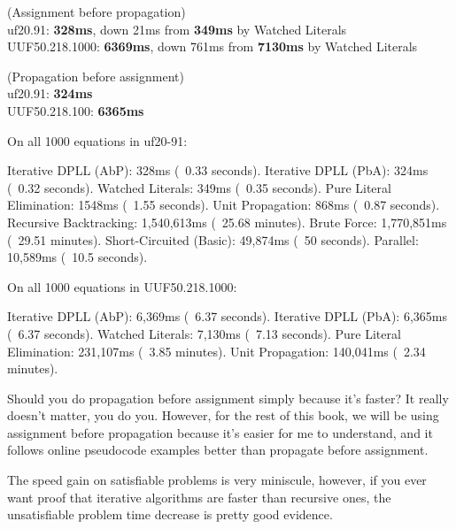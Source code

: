 \documentclass[../main.tex]{subfiles}
\begin{document}
(Assignment before propagation)\\
uf20.91: \textbf{328ms}, down 21ms from \textbf{349ms} by Watched Literals\\
UUF50.218.1000: \textbf{6369ms}, down 761ms from \textbf{7130ms} by Watched Literals

(Propagation before assignment)\\
uf20.91: \textbf{324ms}\\
UUF50.218.100: \textbf{6365ms}

\begin{FVerbatim}
On all 1000 equations in uf20-91:

Iterative DPLL (AbP):      328ms (~0.33 seconds).
Iterative DPLL (PbA):      324ms (~0.32 seconds).
Watched Literals:          349ms (~0.35 seconds).
Pure Literal Elimination:  1548ms (~1.55 seconds).
Unit Propagation:          868ms (~0.87 seconds).
Recursive Backtracking:    1,540,613ms (~25.68 minutes).
Brute Force:               1,770,851ms (~29.51 minutes).
Short-Circuited (Basic):   49,874ms (~50 seconds).
Parallel:                  10,589ms (~10.5 seconds).

On all 1000 equations in UUF50.218.1000:

Iterative DPLL (AbP):     6,369ms (~6.37 seconds).
Iterative DPLL (PbA):     6,365ms (~6.37 seconds).
Watched Literals:         7,130ms (~7.13 seconds).
Pure Literal Elimination: 231,107ms (~3.85 minutes).
Unit Propagation:         140,041ms (~2.34 minutes).
\end{FVerbatim}

Should you do propagation before assignment simply because it's faster? It 
really doesn't matter, you do you. However, for the rest of this book, we will be 
using assignment before propagation because it's easier for me to understand, and it 
follows online pseudocode examples better than propagate before assignment.

The speed gain on satisfiable problems is very miniscule, however, if you ever want 
proof that iterative algorithms are faster than recursive ones, the unsatisfiable 
problem time decrease is pretty good evidence.
\end{document}
